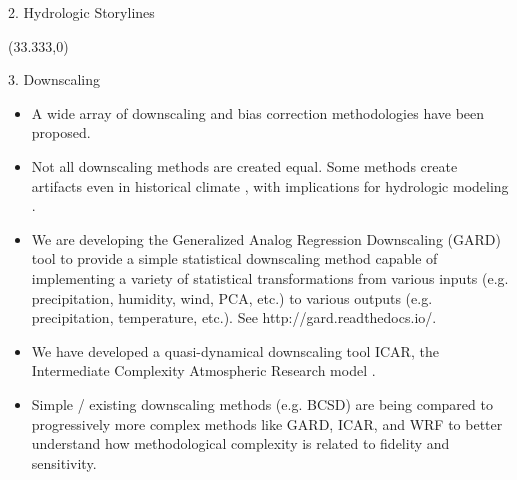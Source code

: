 \documentclass{beamer}
\begin{document}
\begin{frame}{}
\begin{columns}
\begin{column}{.3333\paperwidth}
\begin{textblock}{\textwidth \TPHorizModule}
\begin{block}{2. Hydrologic Storylines}
    \end{block}
   \end{textblock}



   \begin{textblock}{\textwidth \TPHorizModule}(33.333,0)
    \begin{block}{3. Downscaling}


     \begin{itemize}
      \justifying

      \item A wide array of downscaling and bias correction methodologies have been proposed.
      \item Not all downscaling methods are created equal. Some methods create artifacts even in historical climate \citep{Gutmann_2014}, with implications for hydrologic modeling \citep{Mizukami_2016}.
      \item We are developing the Generalized Analog Regression Downscaling (GARD) tool to provide a simple statistical downscaling method capable of implementing a variety of statistical transformations from various inputs (e.g. precipitation, humidity, wind, PCA, etc.) to various outputs (e.g. precipitation, temperature, etc.). See http://gard.readthedocs.io/.
      \item We have developed a quasi-dynamical downscaling tool ICAR, the Intermediate Complexity Atmospheric Research model \citep{Gutmann_2016}.
      \item Simple / existing downscaling methods (e.g. BCSD) are being compared to progressively more complex methods like GARD, ICAR, and WRF to better understand how methodological complexity is related to fidelity and sensitivity.


\end{itemize}
\end{block}
\end{textblock}
\end{column}
\end{columns}
\end{frame}
\end{document}
